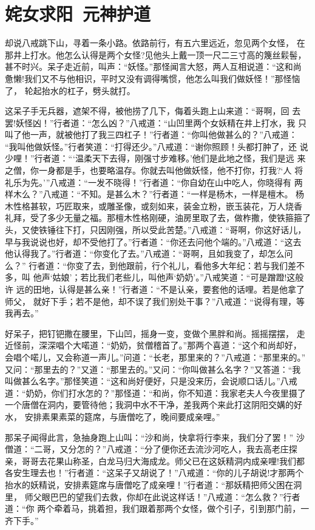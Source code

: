 \chapter{姹女求阳~元神护道}

却说八戒跳下山，寻着一条小路。依路前行，有五六里远近，忽见两个女怪，
在那井上打水。他怎么认得是两个女怪?见他头上戴一顶一尺二三寸高的篾丝鬏髻，
甚不时兴。呆子走近前，叫声：“妖怪。”那怪闻言大怒，两人互相说道：“这和尚
惫懒!我们又不与他相识，平时又没有调得嘴惯，他怎么叫我们做妖怪！”那怪恼了，
轮起抬水的杠子，劈头就打。

这呆子手无兵器，遮架不得，被他捞了几下，侮着头跑上山来道：“哥啊，回
去罢!妖怪凶！”行者道：“怎么凶？”八戒道：“山凹里两个女妖精在井上打水，我
只叫了他一声，就被他打了我三四杠子！”行者道：“你叫他做甚么的？”八戒道：
“我叫他做妖怪。”行者笑道：“打得还少。”八戒道：“谢你照顾！头都打肿了，还
说少哩！”行者道：“‘温柔天下去得，刚强寸步难移。’他们是此地之怪，我们是远
来之僧，你一身都是手，也要略温存。你就去叫他做妖怪，他不打你，打我?‘人
将礼乐为先。’”八戒道：“一发不晓得！”行者道：“你自幼在山中吃人，你晓得有
两样木么？”八戒道：“不知。是甚么木？”行者道：“一样是杨木，一样是檀木。
杨木性格甚软，巧匠取来，或雕圣像，或刻如来，装金立粉，嵌玉装花，万人烧香
礼拜，受了多少无量之福。那檀木性格刚硬，油房里取了去，做柞撒，使铁箍箍了
头，又使铁锤往下打，只因刚强，所以受此苦楚。”八戒道：“哥啊，你这好话儿，
早与我说说也好，却不受他打了。”行者道：“你还去问他个端的。”八戒道：“这去
他认得我了。”行者道：“你变化了去。”八戒道：“哥啊，且如我变了，却怎么问么？”
行者道：“你变了去，到他跟前，行个礼儿，看他多大年纪：若与我们差不多，叫
他声‘姑娘’；若比我们老些儿，叫他声‘奶奶’。”八戒笑道：“可是蹭蹬!这般许
远的田地，认得是甚么亲！”行者道：“不是认亲，要套他的话哩。若是他拿了师父，
就好下手；若不是他，却不误了我们别处干事？”八戒道：“说得有理，等我再去。”

好呆子，把钉钯撒在腰里，下山凹，摇身一变，变做个黑胖和尚。摇摇摆摆，
走近怪前，深深唱个大喏道：“奶奶，贫僧稽首了。”那两个喜道：“这个和尚却好，
会唱个喏儿，又会称道一声儿。”问道：“长老，那里来的？”八戒道：“那里来的。”
又问：“那里去的？”又道：“那里去的。”又问：“你叫做甚么名字？”又答道：“我
叫做甚么名字。”那怪笑道：“这和尚好便好，只是没来历，会说顺口话儿。”八戒
道：“奶奶，你们打水怎的？”那怪道：“和尚，你不知道：我家老夫人今夜里摄了
一个唐僧在洞内，要管待他；我洞中水不干净，差我两个来此打这阴阳交媾的好水，
安排素果素菜的筵席，与唐僧吃了，晚间要成亲哩。”

那呆子闻得此言，急抽身跑上山叫：“沙和尚，快拿将行李来，我们分了罢！”
沙僧道：“二哥，又分怎的？”八戒道：“分了便你还去流沙河吃人，我去高老庄探
亲，哥哥去花果山称圣，白龙马归大海成龙。师父已在这妖精洞内成亲哩!我们都
各安生理去也！”行者道：“这呆子又胡说了！”八戒道：“你的儿子胡说!才那两个
抬水的妖精说，安排素筵席与唐僧吃了成亲哩！”行者道：“那妖精把师父困在洞里，
师父眼巴巴的望我们去救，你却在此说这样话！”八戒道：“怎么救？”行者道：“你
两个牵着马，挑着担，我们跟着那两个女怪，做个引子，引到那门前，一齐下手。”

